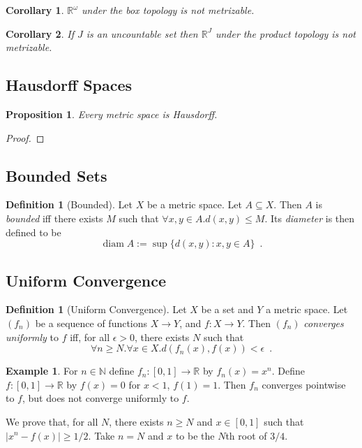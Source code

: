 \documentclass{book}
\let\qed\relax
\newtheorem{prop}[ax]{Proposition}
\newtheorem{cor}{Corollary}[ax]
\theoremstyle{definition}
\newtheorem{df}[ax]{Definition}
\newtheorem{ex}[ax]{Example}
\newcommand{\diam}{\ensuremath{\operatorname{diam}}}
\begin{document}
\begin{cor}
$\mathbb{R}^\omega$ under the box topology is not metrizable.
\end{cor}

\begin{cor}
If $J$ is an uncountable set then $\mathbb{R}^J$ under the product topology is not metrizable.
\end{cor}

\subsection{Hausdorff Spaces}

\begin{prop}
Every metric space is Hausdorff.
\end{prop}

\begin{proof}
\pf
{}
\qed
\end{proof}

\subsection{Bounded Sets}

\begin{df}[Bounded]
Let $X$ be a metric space. Let $A \subseteq X$. Then $A$ is \emph{bounded} iff there exists $M$ such that $\forall x,y \in A. d(x,y) \leq M$. Its \emph{diameter} is then defined to be
\[ \diam A := \sup \{ d(x,y) : x,y \in A \} \enspace . \]
\end{df}

\subsection{Uniform Convergence}

\begin{df}[Uniform Convergence]
Let $X$ be a set and $Y$ a metric space. Let $(f_n)$ be a sequence of functions $X \rightarrow Y$, and $f : X \rightarrow Y$. Then $(f_n)$ \emph{converges uniformly} to $f$ iff, for all $\epsilon > 0$, there exists $N$ such that
\[ \forall n \geq N. \forall x \in X. d(f_n(x),f(x)) < \epsilon \enspace . \]
\end{df}

\begin{ex}
For $n \in \mathbb{N}$ define $f_n : [0,1] \rightarrow \mathbb{R}$ by $f_n(x) = x^n$. Define $f : [0,1] \rightarrow \mathbb{R}$ by $f(x) = 0$ for $x < 1$, $f(1) = 1$. Then $f_n$ converges pointwise to $f$, but does not converge uniformly to $f$.

We prove that, for all $N$, there exists $n \geq N$ and $x \in [0,1]$ such that $|x^n - f(x)| \geq 1/2$. Take $n = N$ and $x$ to be the $N$th root of $3/4$.
\end{ex}
\end{document}
